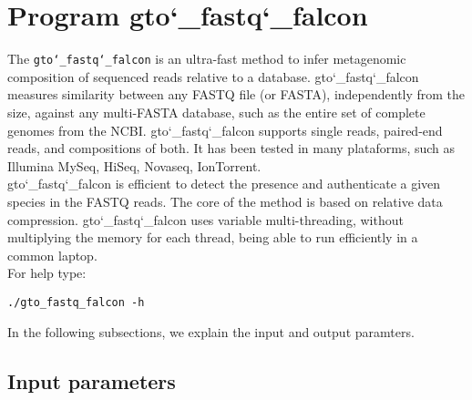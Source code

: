 \section{Program gto\char`_fastq\char`_falcon}
The \texttt{gto\char`_fastq\char`_falcon} is an ultra-fast method to infer metagenomic composition of sequenced reads relative to a database. gto\char`_fastq\char`_falcon measures similarity between any FASTQ file (or FASTA), independently from the size, against any multi-FASTA database, such as the entire set of complete genomes from the NCBI. gto\char`_fastq\char`_falcon supports single reads, paired-end reads, and compositions of both. It has been tested in many plataforms, such as Illumina MySeq, HiSeq, Novaseq, IonTorrent.\\
gto\char`_fastq\char`_falcon is efficient to detect the presence and authenticate a given species in the FASTQ reads. The core of the method is based on relative data compression. gto\char`_fastq\char`_falcon uses variable multi-threading, without multiplying the memory for each thread, being able to run efficiently in a common laptop.\\
For help type:
\begin{lstlisting}
./gto_fastq_falcon -h
\end{lstlisting}
In the following subsections, we explain the input and output paramters.

\subsection*{Input parameters}

